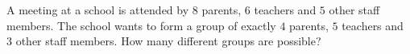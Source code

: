 A meeting at a school is attended by $8$ parents, $6$ teachers and $5$ other staff members. The school wants to form a group of exactly $4$ parents, $5$ teachers and $3$ other staff members. How many different groups are possible?
